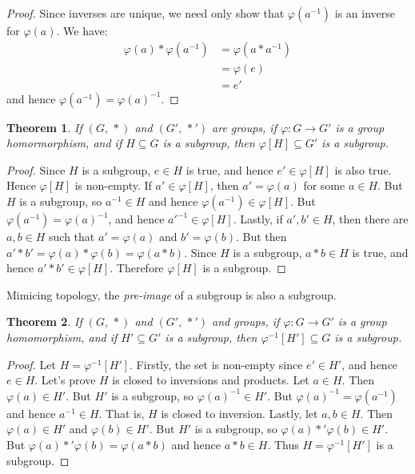 \documentclass{article}
\theoremstyle{plain}
\newtheorem{theorem}{Theorem}[section]
\theoremstyle{normal}
\begin{document}
        \begin{proof}
            Since inverses are unique, we need only show that
            $\varphi(a^{-1})$ is an inverse for $\varphi(a)$. We have:
            \begin{align}
                \varphi(a)*\varphi(a^{-1})
                &=\varphi(a*a^{-1})\tag{Homomorphism}\\
                &=\varphi(e)\tag{Identity}\\
                &=e'\tag{Previous Theorem}
            \end{align}
            and hence $\varphi(a^{-1})=\varphi(a)^{-1}$.
        \end{proof}
        \begin{theorem}
            If $(G,\,*)$ and $(G',\,*')$ are groups, if
            $\varphi:G\rightarrow{G}'$ is a group homormorphism, and if
            $H\subseteq{G}$ is a subgroup, then
            $\varphi[H]\subseteq{G}'$ is a subgroup.
        \end{theorem}
        \begin{proof}
            Since $H$ is a subgroup, $e\in{H}$ is true, and hence
            $e'\in\varphi[H]$ is also true. Hence $\varphi[H]$ is non-empty.
            If $a'\in\varphi[H]$, then $a'=\varphi(a)$ for some $a\in{H}$.
            But $H$ is a subgroup, so $a^{-1}\in{H}$ and hence
            $\varphi(a^{-1})\in\varphi[H]$. But
            $\varphi(a^{-1})=\varphi(a)^{-1}$, and hence
            $a'^{-1}\in\varphi[H]$. Lastly, if $a',b'\in{H}$, then there are
            $a,b\in{H}$ such that $a'=\varphi(a)$ and $b'=\varphi(b)$. But
            then $a'*b'=\varphi(a)*\varphi(b)=\varphi(a*b)$. Since $H$ is a
            subgroup, $a*b\in{H}$ is true, and hence $a'*b'\in\varphi[H]$.
            Therefore $\varphi[H]$ is a subgroup.
        \end{proof}
        Mimicing topology, the \textit{pre-image} of a subgroup is also a
        subgroup.
        \begin{theorem}
            If $(G,\,*)$ and $(G',\,*')$ and groups, if
            $\varphi:G\rightarrow{G}'$ is a group homomorphism,
            and if $H'\subseteq{G}'$ is a subgroup, then
            $\varphi^{-1}[H']\subseteq{G}$ is a subgroup.
        \end{theorem}
        \begin{proof}
            Let $H=\varphi^{-1}[H']$. Firstly, the set is non-empty since
            $e'\in{H}'$, and hence $e\in{H}$. Let's prove $H$ is closed to
            inversions and products. Let
            $a\in{H}$. Then $\varphi(a)\in{H}'$. But $H'$ is a subgroup,
            so $\varphi(a)^{-1}\in{H}'$. But $\varphi(a)^{-1}=\varphi(a^{-1})$
            and hence $a^{-1}\in{H}$. That is, $H$ is closed to inversion.
            Lastly, let $a,b\in{H}$. Then $\varphi(a)\in{H}'$ and
            $\varphi(b)\in{H}'$. But $H'$ is a subgroup, so
            $\varphi(a)*'\varphi(b)\in{H}'$. But
            $\varphi(a)*'\varphi(b)=\varphi(a*b)$ and hence
            $a*b\in{H}$. Thus $H=\varphi^{-1}[H']$ is a subgroup.
        \end{proof}
\end{document}
